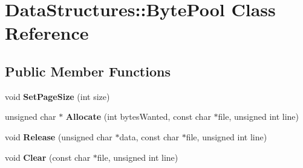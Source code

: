 \hypertarget{class_data_structures_1_1_byte_pool}{\section{Data\-Structures\-:\-:Byte\-Pool Class Reference}
\label{class_data_structures_1_1_byte_pool}
}
\subsection*{Public Member Functions}
\begin{DoxyCompactItemize}
\item 
\hypertarget{class_data_structures_1_1_byte_pool_a6335da45280e2e98a08a7ba87c673933}{void {\bfseries Set\-Page\-Size} (int size)}\label{class_data_structures_1_1_byte_pool_a6335da45280e2e98a08a7ba87c673933}

\item 
\hypertarget{class_data_structures_1_1_byte_pool_a0248385510ef8571e5d0b081627a7dd5}{unsigned char $\ast$ {\bfseries Allocate} (int bytes\-Wanted, const char $\ast$file, unsigned int line)}\label{class_data_structures_1_1_byte_pool_a0248385510ef8571e5d0b081627a7dd5}

\item 
\hypertarget{class_data_structures_1_1_byte_pool_a367a33078607f6e5ec11b700b3b6ba23}{void {\bfseries Release} (unsigned char $\ast$data, const char $\ast$file, unsigned int line)}\label{class_data_structures_1_1_byte_pool_a367a33078607f6e5ec11b700b3b6ba23}

\item 
\hypertarget{class_data_structures_1_1_byte_pool_a738b7686e2190c4b790e962f2ecf8615}{void {\bfseries Clear} (const char $\ast$file, unsigned int line)}\label{class_data_structures_1_1_byte_pool_a738b7686e2190c4b790e962f2ecf8615}

\end{DoxyCompactItemize}
